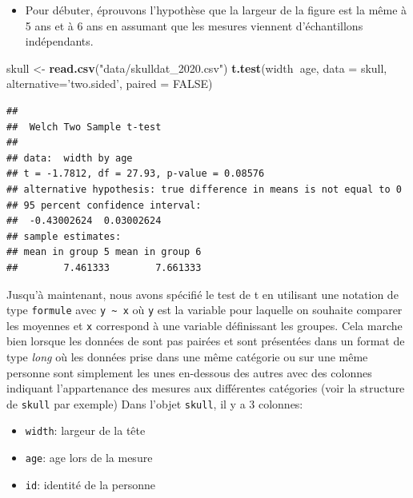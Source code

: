 \documentclass[12pt,]{book}
\newenvironment{Shaded}{\begin{snugshade}}{\end{snugshade}}
\newcommand{\DataTypeTok}[1]{\textcolor[rgb]{0.13,0.29,0.53}{#1}}
\newcommand{\KeywordTok}[1]{\textcolor[rgb]{0.13,0.29,0.53}{\textbf{#1}}}
\newcommand{\NormalTok}[1]{#1}
\newcommand{\OperatorTok}[1]{\textcolor[rgb]{0.81,0.36,0.00}{\textbf{#1}}}
\newcommand{\OtherTok}[1]{\textcolor[rgb]{0.56,0.35,0.01}{#1}}
\newcommand{\StringTok}[1]{\textcolor[rgb]{0.31,0.60,0.02}{#1}}
\providecommand{\tightlist}{%
  \setlength{\itemsep}{0pt}\setlength{\parskip}{0pt}}
\begin{document}
\begin{itemize}
\tightlist
\item
  Pour débuter, éprouvons l'hypothèse que la largeur de la figure est la même à 5 ans et à 6 ans en assumant que les mesures viennent d'échantillons indépendants.
\end{itemize}

\begin{Shaded}
\begin{Highlighting}[]
\NormalTok{skull <-}\StringTok{ }\KeywordTok{read.csv}\NormalTok{(}\StringTok{"data/skulldat_2020.csv"}\NormalTok{)}
\KeywordTok{t.test}\NormalTok{(width}\OperatorTok{~}\NormalTok{age, }\DataTypeTok{data =}\NormalTok{ skull,}
  \DataTypeTok{alternative=}\StringTok{'two.sided'}\NormalTok{,}
  \DataTypeTok{paired =} \OtherTok{FALSE}\NormalTok{)}
\end{Highlighting}
\end{Shaded}

\begin{verbatim}
## 
##  Welch Two Sample t-test
## 
## data:  width by age
## t = -1.7812, df = 27.93, p-value = 0.08576
## alternative hypothesis: true difference in means is not equal to 0
## 95 percent confidence interval:
##  -0.43002624  0.03002624
## sample estimates:
## mean in group 5 mean in group 6 
##        7.461333        7.661333
\end{verbatim}

Jusqu'à maintenant, nous avons spécifié le test de t en utilisant une notation de type \texttt{formule} avec \texttt{y\ \textasciitilde{}\ x} où \texttt{y} est la variable pour laquelle on souhaite comparer les moyennes et \texttt{x} correspond à une variable définissant les groupes.
Cela marche bien lorsque les données de sont pas pairées et sont présentées dans un format de type \emph{long} où les données prise dans une même catégorie ou sur une même personne sont simplement les unes en-dessous des autres avec des colonnes indiquant l'appartenance des mesures aux différentes catégories (voir la structure de \texttt{skull} par exemple)
Dans l'objet \texttt{skull}, il y a 3 colonnes:

\begin{itemize}
\tightlist
\item
  \texttt{width}: largeur de la tête
\item
  \texttt{age}: age lors de la mesure
\item
  \texttt{id}: identité de la personne
\end{itemize}
\end{document}
